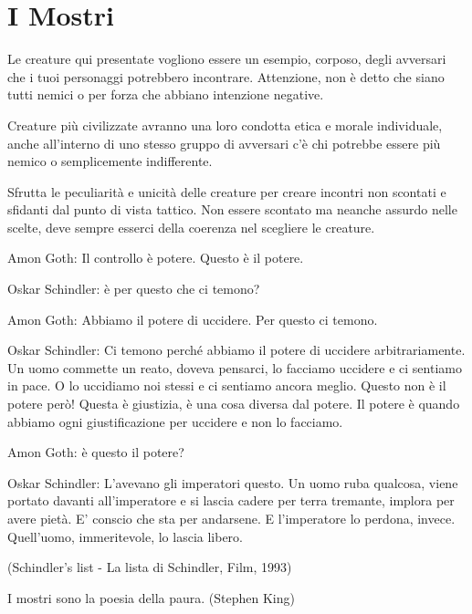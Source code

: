 \section{I Mostri}

\begin{narratore}[Un pò di mostri...]
	Le creature qui presentate vogliono essere un esempio, corposo, degli avversari che i tuoi personaggi potrebbero incontrare. Attenzione, non è detto che siano tutti nemici o per forza che abbiano intenzione negative.

	Creature più civilizzate avranno una loro condotta etica e morale individuale, anche all'interno di uno stesso gruppo di avversari c'è chi potrebbe essere più nemico o semplicemente indifferente.

	Sfrutta le peculiarità e unicità delle creature per creare incontri non scontati e sfidanti dal punto di vista tattico. Non essere scontato ma neanche assurdo nelle scelte, deve sempre esserci della coerenza nel scegliere le creature.
\end{narratore}

\bigskip

\begin{enfasi}{

Amon Goth: Il controllo è potere. Questo è il potere.

Oskar Schindler: è per questo che ci temono?

Amon Goth: Abbiamo il potere di uccidere. Per questo ci temono.

Oskar Schindler: Ci temono perché abbiamo il potere di uccidere arbitrariamente. Un uomo commette un reato, doveva pensarci, lo facciamo uccidere e ci sentiamo in pace. O lo uccidiamo noi stessi e ci sentiamo ancora meglio. Questo non è il potere però! Questa è giustizia, è una cosa diversa dal potere. Il potere è quando abbiamo ogni giustificazione per uccidere e non lo facciamo.

Amon Goth: è questo il potere?

Oskar Schindler: L'avevano gli imperatori questo. Un uomo ruba qualcosa, viene portato davanti all'imperatore e si lascia cadere per terra tremante, implora per avere pietà. E' conscio che sta per andarsene. E l'imperatore lo perdona, invece. Quell'uomo, immeritevole, lo lascia libero.

(Schindler's list - La lista di Schindler, Film, 1993)

\medskip

I mostri sono la poesia della paura. (Stephen King)
}\end{enfasi}

